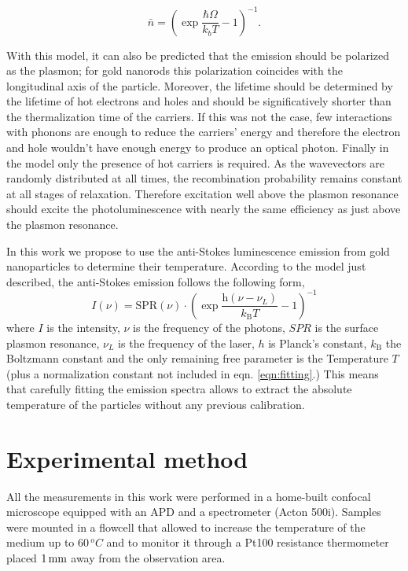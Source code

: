 \begin{equation}
	\bar{n}=\left(\exp\frac{\hbar\Omega}{k_bT}-1\right)^{-1}.
\end{equation}

With this model, it can also be predicted that the emission should be polarized
as the plasmon; for gold nanorods this polarization coincides with the
longitudinal axis of the particle\cite{He2015}. Moreover, the lifetime should be
determined by the lifetime of hot electrons and holes and should be
significatively shorter than the thermalization time of the carriers. If this
was not the case, few interactions with phonons are enough to reduce the
carriers' energy and therefore the electron and hole wouldn't have enough energy
to produce an optical photon. Finally in the model only the presence of hot
carriers is required. As the wavevectors are randomly distributed at all times,
the recombination probability remains constant at all stages of relaxation.
Therefore excitation well above the plasmon resonance should excite the
photoluminescence with nearly the same efficiency as just above the plasmon
resonance.

In this work we propose to use the anti-Stokes luminescence emission from gold
nanoparticles to determine their temperature. According to the model just
described, the anti-Stokes emission follows the following form,
\begin{equation}\label{eqn:fitting}
	I(\nu) =
	\textrm{SPR}(\nu)\cdot\left(\exp\frac{\textrm{h}(\nu-\nu_L)}{k_\textrm{B}T}-1\right)^{-1}
\end{equation}
where $I$ is the intensity, $\nu$ is the frequency of the photons, $SPR$ is the
surface plasmon resonance, $\nu_L$ is the frequency of the laser, $h$ is
Planck's constant, $k_\textrm{B}$ the Boltzmann constant and the only remaining
free parameter is the Temperature $T$ (plus a normalization constant not
included in eqn. \ref{eqn:fitting}.) This means that carefully fitting the
emission spectra allows to extract the absolute temperature of the
particles without any previous calibration.

\section{Experimental method}
All the measurements in this work were performed in a home-built confocal
microscope equipped with an APD and a spectrometer (Acton 500i). Samples were
mounted in a flowcell that allowed to increase the temperature of the medium up
to $60\,^oC$ and to monitor it through a Pt100 resistance thermometer placed
$1\,\textrm{mm}$ away from the observation area.

